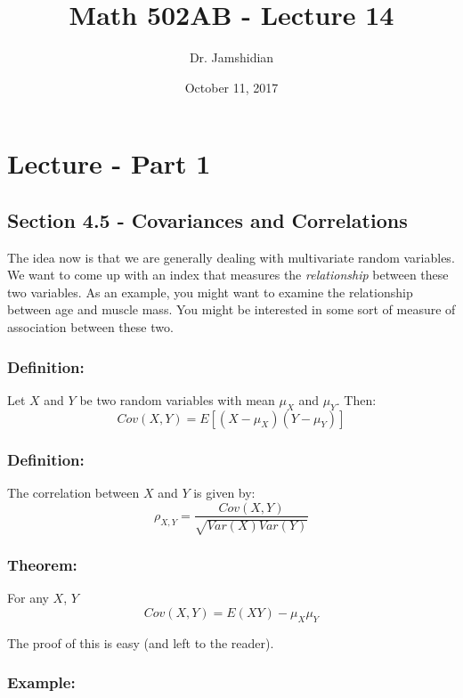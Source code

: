 \documentclass{article}
\title{Math 502AB - Lecture 14}
\author{Dr. Jamshidian}
\date{October 11, 2017}
\begin{document}
\maketitle

\section{Lecture - Part 1}

\subsection{Section 4.5 - Covariances and Correlations}

The idea now is that we are generally dealing with multivariate random variables. We want to come up with an index that measures the \textit{relationship} between these two variables. As an example, you might want to examine the relationship between age and muscle mass. You might be interested in some sort of measure of association between these two.

\subsubsection*{Definition:}

Let $X$ and $Y$ be two random variables with mean $\mu_X$ and $\mu_Y$. Then:
\begin{equation*}
    Cov(X,Y) = E[(X-\mu_X)(Y-\mu_Y)]
\end{equation*}

\subsubsection*{Definition:}
The correlation between $X$ and $Y$ is given by:
\begin{equation*}
    \rho_{X,Y} = \frac{Cov(X,Y)}{\sqrt{Var(X)Var(Y)}}
\end{equation*}

\subsubsection*{Theorem:}
For any $X$, $Y$
\begin{equation*}
    Cov(X,Y) = E(XY) - \mu_X\mu_Y
\end{equation*}

The proof of this is easy (and left to the reader).

\subsubsection*{Example:}
\end{document}
